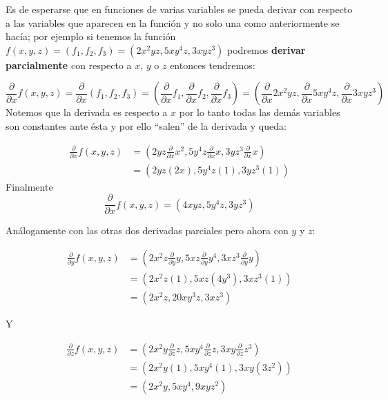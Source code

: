 Es de esperarse que en funciones de varias variables se pueda derivar con respecto a las variables que aparecen en la función y no solo una como anteriormente se hacía; por ejemplo si tenemos la función $f(x,y,z)=(f_1,f_2,f_3)=(2x^2yz,5xy^4z,3xyz^3)$ podremos \textbf{derivar parcialmente} con respecto a $x$, $y$ o $z$ entonces tendremos:

\begin{equation*}
    \frac{\partial}{\partial x} f(x,y,z)=\frac{\partial}{\partial x}(f_1,f_2,f_3)=(\frac{\partial}{\partial x} f_1,\frac{\partial}{\partial x} f_2,\frac{\partial}{\partial x} f_3)=(\frac{\partial}{\partial x} 2x^2yz,\frac{\partial}{\partial x} 5xy^4z,\frac{\partial}{\partial x} 3xyz^3)
\end{equation*}
Notemos que la derivada es respecto a $x$ por lo tanto todas las demás variables son constantes ante ésta y por ello ``salen'' de la derivada y queda:

\begin{equation*}
\begin{split}
    \frac{\partial}{\partial x} f(x,y,z)&=(2yz \frac{\partial}{\partial x}x^2,5y^4z\frac{\partial}{\partial x}x,3yz^3\frac{\partial}{\partial x}x)\\
    &=(2yz(2x),5y^4z(1),3yz^3(1))
\end{split}
\end{equation*}
Finalmente
\begin{equation*}
    \frac{\partial}{\partial x} f(x,y,z)=(4xyz,5y^4z,3yz^3)
\end{equation*}

Análogamente con las otras dos derivadas parciales pero ahora con $y$ y $z$:

\begin{equation*}
\begin{split}
    \frac{\partial}{\partial y} f(x,y,z)&=(2x^2z \frac{\partial}{\partial y}y,5xz\frac{\partial}{\partial y}y^4,3xz^3\frac{\partial}{\partial y}y)\\
    &=(2x^2z(1),5xz(4y^3),3xz^3(1))\\
    &=(2x^2z,20xy^3z,3xz^3)
\end{split}
\end{equation*}

Y

\begin{equation*}
\begin{split}
    \frac{\partial}{\partial z} f(x,y,z)&=(2x^2y \frac{\partial}{\partial z}z,5xy^4\frac{\partial}{\partial z}z,3xy\frac{\partial}{\partial z}z^3)\\
    &=(2x^2y(1),5xy^4(1),3xy(3z^2))\\
    &=(2x^2y,5xy^4,9xyz^2)
\end{split}
\end{equation*}

